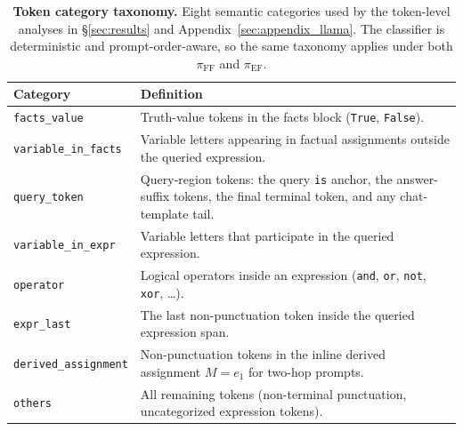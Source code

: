 \documentclass[11pt]{article}
\begin{document}
\begin{table}[t]
\centering
\small
\renewcommand{\arraystretch}{1.0}
\setlength{\tabcolsep}{4pt}
\begin{tabularx}{\columnwidth}{@{}lX@{}}
\toprule
\textbf{Category} & \textbf{Definition} \\
\midrule
\texttt{facts\_value}        & Truth-value tokens in the facts block (\texttt{True}, \texttt{False}). \\
\texttt{variable\_in\_facts} & Variable letters appearing in factual assignments outside the queried expression. \\
\texttt{query\_token}        & Query-region tokens: the query \texttt{is} anchor, the answer-suffix tokens, the final terminal token, and any chat-template tail. \\
\texttt{variable\_in\_expr}  & Variable letters that participate in the queried expression. \\
\texttt{operator}            & Logical operators inside an expression (\texttt{and}, \texttt{or}, \texttt{not}, \texttt{xor}, \ldots). \\
\texttt{expr\_last}          & The last non-punctuation token inside the queried expression span. \\
\texttt{derived\_assignment} & Non-punctuation tokens in the inline derived assignment $M = e_{1}$ for two-hop prompts. \\
\texttt{others}              & All remaining tokens (non-terminal punctuation, uncategorized expression tokens). \\
\bottomrule
\end{tabularx}
\caption{\textbf{Token category taxonomy.} Eight semantic categories used by the token-level analyses in \S\ref{sec:results} and Appendix~\ref{sec:appendix_llama}. The classifier is deterministic and prompt-order-aware, so the same taxonomy applies under both $\pi_{\mathrm{FF}}$ and $\pi_{\mathrm{EF}}$.}
\label{tab:token_categories}
\vspace{-0.6em}
\end{table}


\end{document}

